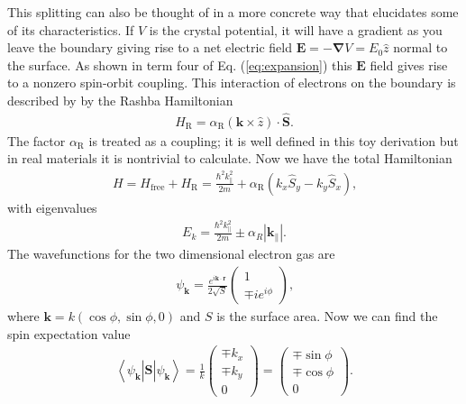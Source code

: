 \documentclass[12pt]{article}
\begin{document}
This splitting can also be thought of in a more concrete way that elucidates some of its characteristics.
If $V$ is the crystal potential, it will have a gradient as you leave the boundary giving rise to a net electric field $\boldsymbol{E}=-\boldsymbol{\nabla}V=E_0\hat{z}$ normal to the surface.
As shown in term four of Eq. (\ref{eq:expansion}) this $\boldsymbol{E}$ field gives rise to a nonzero spin-orbit coupling.
This interaction of electrons on the boundary is described by by the Rashba Hamiltonian
\begin{align}
  \label{eq:rashba}
  H_{\text{R}}=\alpha_{\text{R}}(\boldsymbol{k}\times\hat{z})\cdot\hat{\boldsymbol{S}}\text{.}
\end{align}
The factor $\alpha_{\text{R}}$ is treated as a coupling; it is well defined in this toy derivation but in real materials it is nontrivial to calculate.
Now we have the total Hamiltonian
\begin{align}
  \label{eq:totalH}
  H=H_{\text{free}}+H_{\text{R}}=\frac{\hbar^2k_\parallel^2}{2m}+\alpha_{\text{R}}(k_x\hat{S}_y-k_y\hat{S}_x)\text{,}
\end{align}
with eigenvalues
\begin{align}
  \label{eq:eigenvalues}
  E_k=\frac{\hbar^2k_{\parallel}^2}{2m}\pm\alpha_{R}\left|\boldsymbol{k}_{\parallel}\right|\text{.}
\end{align}
The wavefunctions for the two dimensional electron gas are
\begin{align}
  \label{eq:wavefn}
  \psi_{\boldsymbol{k}}=\frac{e^{i\boldsymbol{k}\cdot\boldsymbol{r}}}{2\sqrt{S}}\left(\begin{array}{c} 1 \\ \mp ie^{i\phi} \end{array} \right)\text{,}
\end{align}
where $\boldsymbol{k}=k(\cos\phi,\sin\phi,0)$ and $S$ is the surface area.
Now we can find the spin expectation value
\begin{align}
  \label{eq:expectation}
  \left<\psi_{\boldsymbol{k}}\left|\hat{\boldsymbol{S}}\right|\psi_{\boldsymbol{k}}\right>=\frac{1}{k}\left(\begin{array}{c} \mp k_x \\ \mp k_y \\ 0 \end{array} \right) = \left(\begin{array}{c} \mp \sin\phi \\ \mp \cos\phi \\ 0 \end{array} \right)\text{.}
\end{align}
\end{document}
